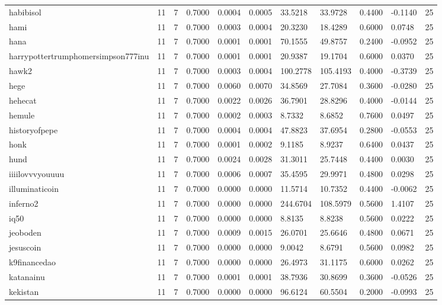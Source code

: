\begin{table}[htbp]
\begin{tabular}{lllllllllll}
habibisol & 11 & 7 & 0.7000 & 0.0004 & 0.0005 & 33.5218 & 33.9728 & 0.4400 & -0.1140 & 25 \\
hami & 11 & 7 & 0.7000 & 0.0003 & 0.0004 & 20.3230 & 18.4289 & 0.6000 & 0.0748 & 25 \\
hana & 11 & 7 & 0.7000 & 0.0001 & 0.0001 & 70.1555 & 49.8757 & 0.2400 & -0.0952 & 25 \\
harrypottertrumphomersimpson777inu & 11 & 7 & 0.7000 & 0.0001 & 0.0001 & 20.9387 & 19.1704 & 0.6000 & 0.0370 & 25 \\
hawk2 & 11 & 7 & 0.7000 & 0.0003 & 0.0004 & 100.2778 & 105.4193 & 0.4000 & -0.3739 & 25 \\
hege & 11 & 7 & 0.7000 & 0.0060 & 0.0070 & 34.8569 & 27.7084 & 0.3600 & -0.0280 & 25 \\
hehecat & 11 & 7 & 0.7000 & 0.0022 & 0.0026 & 36.7901 & 28.8296 & 0.4000 & -0.0144 & 25 \\
hemule & 11 & 7 & 0.7000 & 0.0002 & 0.0003 & 8.7332 & 8.6852 & 0.7600 & 0.0497 & 25 \\
historyofpepe & 11 & 7 & 0.7000 & 0.0004 & 0.0004 & 47.8823 & 37.6954 & 0.2800 & -0.0553 & 25 \\
honk & 11 & 7 & 0.7000 & 0.0001 & 0.0002 & 9.1185 & 8.9237 & 0.6400 & 0.0437 & 25 \\
hund & 11 & 7 & 0.7000 & 0.0024 & 0.0028 & 31.3011 & 25.7448 & 0.4400 & 0.0030 & 25 \\
iiiilovvvyouuuu & 11 & 7 & 0.7000 & 0.0006 & 0.0007 & 35.4595 & 29.9971 & 0.4800 & 0.0298 & 25 \\
illuminaticoin & 11 & 7 & 0.7000 & 0.0000 & 0.0000 & 11.5714 & 10.7352 & 0.4400 & -0.0062 & 25 \\
inferno2 & 11 & 7 & 0.7000 & 0.0000 & 0.0000 & 244.6704 & 108.5979 & 0.5600 & 1.4107 & 25 \\
iq50 & 11 & 7 & 0.7000 & 0.0000 & 0.0000 & 8.8135 & 8.8238 & 0.5600 & 0.0222 & 25 \\
jeoboden & 11 & 7 & 0.7000 & 0.0009 & 0.0015 & 26.0701 & 25.6646 & 0.4800 & 0.0671 & 25 \\
jesuscoin & 11 & 7 & 0.7000 & 0.0000 & 0.0000 & 9.0042 & 8.6791 & 0.5600 & 0.0982 & 25 \\
k9financedao & 11 & 7 & 0.7000 & 0.0000 & 0.0000 & 26.4973 & 31.1175 & 0.6000 & 0.0262 & 25 \\
katanainu & 11 & 7 & 0.7000 & 0.0001 & 0.0001 & 38.7936 & 30.8699 & 0.3600 & -0.0526 & 25 \\
kekistan & 11 & 7 & 0.7000 & 0.0000 & 0.0000 & 96.6124 & 60.5504 & 0.2000 & -0.0993 & 25 \\

\end{tabular}
\end{table}
